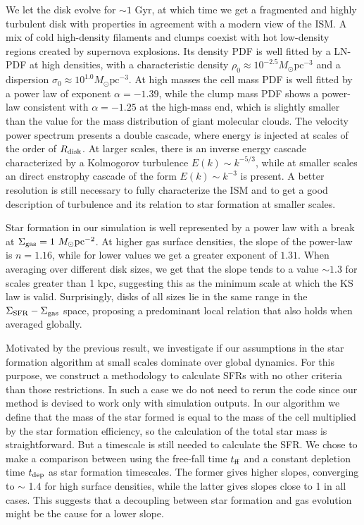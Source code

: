\documentclass[twocolumn]{aastex}
\newcommand{\ssfr}{\Sigma_{\rm SFR}}
\newcommand{\msun}{M_\odot}
\newcommand{\tdep}{t_{\rm dep}}
\newcommand{\tff}{t_{\rm ff}}
\newcommand{\sgas}{\Sigma_{\rm gas}}
\newcommand{\rhoo}{\rho_0}
\begin{document}
We let the disk evolve for $\sim 1$ Gyr, at which time we get a fragmented and highly turbulent disk with properties in agreement with a modern view of the ISM. A mix of cold high-density filaments and clumps coexist with hot low-density regions created by supernova explosions. Its density PDF is well fitted by a LN-PDF at high densities, with a characteristic density $\rhoo \approx 10^{-2.5}\msun \text{pc}^{-3}$ and a dispersion $\sigma_0 \approx 10^{1.0}\msun \text{pc}^{-3}$. At high masses the cell mass PDF is well fitted by a power law of exponent $\alpha = -1.39$, while the clump mass PDF shows a power-law consistent with $\alpha = -1.25$ at the high-mass end, which is slightly smaller than the value for the mass distribution of giant molecular clouds. The velocity power spectrum presents a double cascade, where energy is injected at scales of the order of $R_{\rm disk}$. At larger scales, there is an inverse energy cascade characterized by a Kolmogorov turbulence $E(k) \sim k^{-5/3}$, while at smaller scales an direct enstrophy cascade of the form $E(k) \sim k^{-3}$ is present. A better resolution is still necessary to fully characterize the ISM and to get a good description of turbulence and its relation to star formation at smaller scales.

Star formation in our simulation is well represented by a power law with a break at $\sgas = 1~\msun \text{pc}^{-2}$. At higher gas surface densities, the slope of the power-law is $n = 1.16$, while for lower values we get a greater exponent of $1.31$. When averaging over different disk sizes, we get that the slope tends to a value $\sim 1.3$ for scales greater than 1 kpc, suggesting this as the minimum scale at which the KS law is valid. Surprisingly, disks of all sizes lie in the same range in the $\ssfr - \sgas$ space, proposing a predominant local relation that also holds when averaged globally.

Motivated by the previous result, we investigate if our assumptions in the star formation algorithm at small scales dominate over global dynamics. For this purpose, we construct a methodology to calculate SFRs with no other criteria than those restrictions. In such a case we do not need to rerun the code since our method is devised to work only with simulation outputs. In our algorithm we define that the mass of the star formed is equal to the mass of the cell multiplied by the star formation efficiency, so the calculation of the total star mass is straightforward. But a timescale is still needed to calculate the SFR. We chose to make a comparison between using the free-fall time $\tff$ and a constant depletion time $\tdep$ as star formation timescales. The former gives higher slopes, converging to $\sim$ 1.4 for high surface densities, while the latter gives slopes close to 1 in all cases. This suggests that a decoupling between star formation and gas evolution might be the cause for a lower slope.
\end{document}
